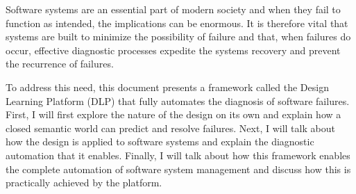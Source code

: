 Software systems are an essential part of modern society and when they fail to function as intended, the implications can be enormous. It is therefore vital that systems are built to minimize the possibility of failure and that, when failures do occur, effective diagnostic processes expedite the systems recovery and prevent the recurrence of failures.

To address this need, this document presents a framework called the Design Learning Platform (DLP) that fully automates the diagnosis of software failures. First, I will first explore the nature of the design on its own and explain how a closed semantic world can predict and resolve failures. Next, I will talk about how the design is applied to software systems and explain the diagnostic automation that it enables. Finally, I will talk about how this framework enables the complete automation of software system management and discuss how this is practically achieved by the platform.